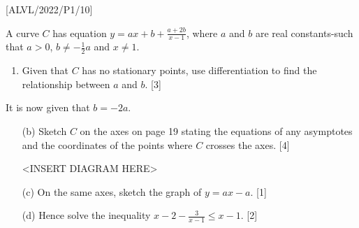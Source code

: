 \item {[}ALVL/2022/P1/10{]}

A curve $C$ has equation $y=ax+b+\frac{a+2b}{x-1}$, where $a$ and
$b$ are real constants-such that $a>0$, $b\neq-\frac{1}{2}a$ and
$x\neq1$. 
\begin{enumerate}
\item Given that $C$ has no stationary points, use differentiation to find
the relationship between $a$ and $b$. \hfill{}{[}3{]}
\end{enumerate}
It is now given that $b=-2a$. 
\begin{enumerate}
\item[(b)]  Sketch $C$ on the axes on page 19 stating the equations of any
asymptotes and the coordinates of the points where $C$ crosses the
axes. \hfill{}{[}4{]}
\noindent \begin{center}
<INSERT DIAGRAM HERE>
\par\end{center}
\item[(c)]  On the same axes, sketch the graph of $y=ax-a$. \hfill{}{[}1{]}
\item[(d)]  Hence solve the inequality $x-2-\frac{3}{x-1}\leq x-1$.\hfill{}
{[}2{]}
\end{enumerate}
